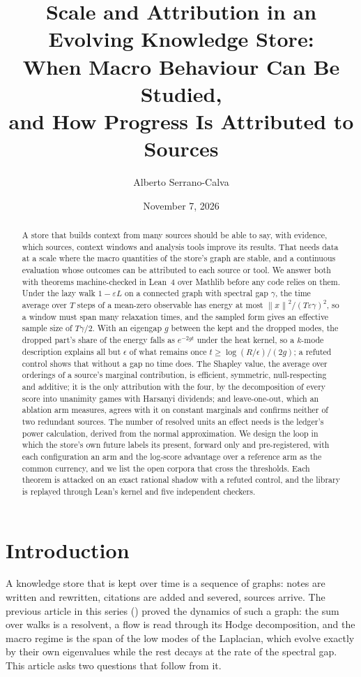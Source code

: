 \documentclass[11pt,a4paper]{article}
\title{Scale and Attribution in an Evolving Knowledge Store:\\
When Macro Behaviour Can Be Studied,\\
and How Progress Is Attributed to Sources}
\author{Alberto Serrano-Calva}
\date{November 7, 2026}
\theoremstyle{plain}
\theoremstyle{definition}
\theoremstyle{remark}
\newcommand{\norm}[1]{\left\lVert #1 \right\rVert}
\newcommand{\lean}[1]{\path{#1}}
\begin{document}
\maketitle

\begin{abstract}
A store that builds context from many sources should be able to say, with evidence, which
sources, context windows and analysis tools improve its results. That needs data at a scale where
the macro quantities of the store's graph are stable, and a continuous evaluation whose outcomes
can be attributed to each source or tool. We answer both with theorems machine-checked in Lean~4
over Mathlib before any code relies on them. Under the lazy walk $1-\varepsilon L$ on a connected
graph with spectral gap $\gamma$, the time average over $T$ steps of a mean-zero observable has
energy at most $\norm{x}^2/(T\varepsilon\gamma)^2$, so a window must span many relaxation times, and
the sampled form gives an effective sample size of $T\gamma/2$. With an eigengap $g$ between the
kept and the dropped modes, the dropped part's share of the energy falls as $e^{-2gt}$ under the
heat kernel, so a $k$-mode description explains all but $\epsilon$ of what remains once
$t \ge \log(R/\epsilon)/(2g)$; a refuted control shows that without a gap no time does. The Shapley
value, the average over orderings of a source's marginal contribution, is efficient, symmetric,
null-respecting and additive; it is the only attribution with the four, by the decomposition of
every score into unanimity games with Harsanyi dividends; and leave-one-out, which an ablation arm
measures, agrees with it on constant marginals and confirms neither of two redundant sources. The
number of resolved units an effect needs is the ledger's power calculation, derived from the normal
approximation. We design the loop in which the store's own future labels its present, forward only
and pre-registered, with each configuration an arm and the log-score advantage over a reference arm
as the common currency, and we list the open corpora that cross the thresholds. Each theorem is
attacked on an exact rational shadow with a refuted control, and the library is replayed through
Lean's kernel and five independent checkers.
\end{abstract}

\section{Introduction}

A knowledge store that is kept over time is a sequence of graphs: notes are written and rewritten,
citations are added and severed, sources arrive. The previous article in this series
(\lean{papers/2026-11-07-graph-dynamics}) proved the dynamics of such a graph: the sum over walks
is a resolvent, a flow is read
through its Hodge decomposition, and the macro regime is the span of the low modes of the
Laplacian, which evolve exactly by their own eigenvalues while the rest decays at the rate of the
spectral gap. This article asks two questions that follow from it.
\end{document}
